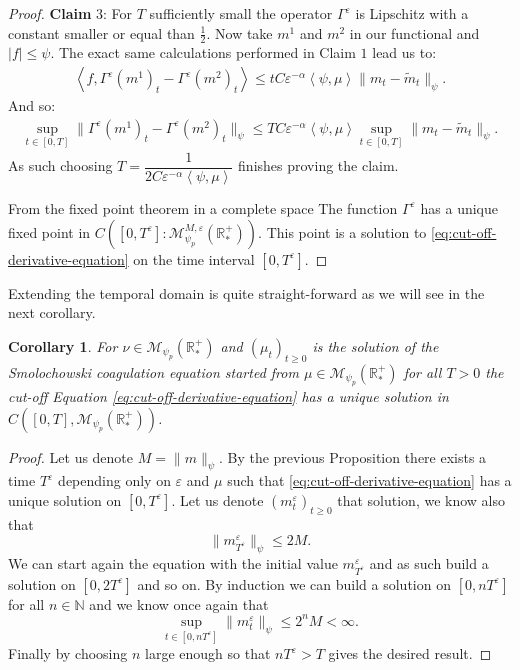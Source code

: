 \documentclass[11pt,a4paper]{article}
\newcommand{\NN}{\mathbb{N}}
\newcommand{\RRP}{\mathbb{R}^+_*}
\newcommand{\MC}{\mathcal{M}}
\newcommand{\Proc}[1]{\left(#1\right)_{t\geq 0}}
\newcommand{\brac}[1]{\left\langle#1\right\rangle}
\newtheorem{corollary}[theorem]{Corollary}
\begin{document}
\begin{proof}
    \textbf{Claim} 3: For $T$ sufficiently small the operator $\Gamma^\varepsilon$ is Lipschitz with a constant smaller or equal than $\frac12$. Now take $m^1$ and $m^2$ in our functional and $|f| \leq \psi$. The exact same calculations performed in Claim $1$ lead us to:
    \begin{align*}
        \brac{f, \Gamma^\varepsilon(m^1)_t - \Gamma^\varepsilon(m^2)_t}  \leq tC\varepsilon^{-\alpha}\brac{\psi,\mu} \| m_t - \tilde{m}_t\|_{\psi}.
    \end{align*}
    And so:
    \begin{align*}
        \sup\limits_{t \in [0,T]} \| \Gamma^\varepsilon(m^1)_t - \Gamma^\varepsilon(m^2)_t\|_{\psi}
        \leq TC\varepsilon^{-\alpha}\brac{\psi,\mu}\sup\limits_{t \in [0,T]} \| m_t - \tilde{m}_t\|_{\psi}.
    \end{align*}
    As such choosing $T = \dfrac{1}{2C\varepsilon^{-\alpha}\brac{\psi,\mu}}$ finishes proving the claim.

    From the fixed point theorem in a complete space The function $\Gamma^\varepsilon$ has a unique fixed point in \(C\left([0,T^\varepsilon]:\MC^{M,\varepsilon}_{\psi_p}\left(\RRP\right) \right) \). This point is a solution to \eqref{eq:cut-off-derivative-equation} on the time interval $[0,T^\varepsilon]$.
\end{proof}
Extending the temporal domain is quite straight-forward as we will see in the next corollary.
\begin{corollary}\label{cor:well-posedness-derivative-unbounded-space}
    For $\nu \in \MC_{\psi_p}(\RRP)$ and $\Proc{\mu_t}$ is the solution of the Smolochowski coagulation equation started from $\mu \in \MC_{\psi_p}(\RRP)$ for all $T > 0$ the cut-off Equation \eqref{eq:cut-off-derivative-equation} has a unique solution in $C\left([0,T],\MC_{\psi_p}(\RRP)\right)$. 
\end{corollary}
\begin{proof}
    Let us denote \(M = \|m \|_{\psi}\). By the previous Proposition there exists a time $T^\varepsilon$ depending only on $\varepsilon$ and $\mu$ such that \eqref{eq:cut-off-derivative-equation} has a unique solution on \( [0,T^\varepsilon]\). Let us denote $\Proc{m^\varepsilon_t}$ that solution, we know also that 
    \[\|m^\varepsilon_{T^\varepsilon} \|_{\psi} \leq 2M.\]
    We can start again the equation with the initial value \(m^\varepsilon_{T^\varepsilon}\) and as such build a solution on \( [0,2T^\varepsilon]\) and so on. By induction we can build a solution on \( [0,nT^\varepsilon]\) for all $n \in \NN$ and we know once again that
    \[ \sup\limits_{t \in [0,n T^\varepsilon]}\|m^\varepsilon_{t} \|_{\psi} \leq 2^n M < \infty .\]
    Finally by choosing $n$ large enough so that \( n T^\varepsilon > T\) gives the desired result.
\end{proof}
\end{document}
